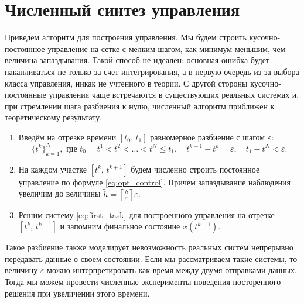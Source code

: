 \section{Численный синтез управления}

Приведем алгоритм для построения управления. Мы будем строить кусочно-постоянное управление на сетке с мелким шагом, как минимум меньшим, чем величина запаздывания. Такой способ не идеален: основная ошибка будет накапливаться не только за счет интегрирования, а в первую очередь из-за выбора класса управления, никак не учтенного в теории. С другой стороны кусочно-постоянные управления чаще встречаются в существующих реальных системах и, при стремлении шага разбиения к нулю, численный алгоритм приближен к теоретическому результату.
\begin{enumerate}
        \item Введём на отрезке времени $[t_0,\,t_1]$ равномерное разбиение с шагом $\varepsilon$:
$$
        \{t^k\}_{k=1}^{N},\mbox{ где }
        t_0 = t^1 < t^2 <\ldots<t^N \leqslant t_1,
        \quad t^{k+1} - t^k = \varepsilon,
        \quad t_1 - t^N < \varepsilon.
$$
        \item На каждом участке $[t^k,\,t^{k+1}]$ будем численно строить постоянное управление по формуле \eqref{eq:opt_control}. Причем запаздывание наблюдения увеличим до величины $\tilde h = \left\lceil\frac{h}{\varepsilon}\right\rceil\varepsilon$.
        \item Решим систему \eqref{eq:first_task} для построенного управления на отрезке $[t^k,\,t^{k+1}]$ и запомним финальное состояние $x(t^{k+1})$.
\end{enumerate}

Такое разбиение также моделирует невозможность реальных систем непрерывно передавать данные о своем состоянии. Если мы рассматриваем такие системы, то величину $\varepsilon$ можно интерпретировать как время между двумя отправками данных. Тогда мы можем провести численные эксперименты поведения посторенного решения при увеличении этого времени.